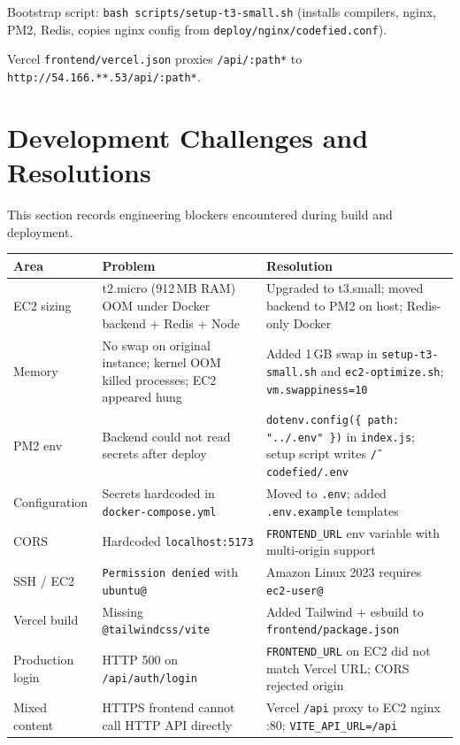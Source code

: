 \documentclass[11pt,a4paper]{article}
\newcommand{\maskedecip}{\texttt{54.166.**.53}}
\begin{document}
Bootstrap script: \texttt{bash scripts/setup-t3-small.sh} (installs compilers, nginx, PM2, Redis, copies nginx config from \texttt{deploy/nginx/codefied.conf}).

Vercel \texttt{frontend/vercel.json} proxies \texttt{/api/:path*} to \texttt{http://\maskedecip/api/:path*}.

\section{Development Challenges and Resolutions}

This section records engineering blockers encountered during build and deployment.

\begin{longtable}{@{}p{3.3cm}p{4cm}p{6.3cm}@{}}
\toprule
\textbf{Area} & \textbf{Problem} & \textbf{Resolution} \\
\midrule
\endhead
EC2 sizing &
t2.micro (912\,MB RAM) OOM under Docker backend + Redis + Node &
Upgraded to t3.small; moved backend to PM2 on host; Redis-only Docker \\
\addlinespace
Memory &
No swap on original instance; kernel OOM killed processes; EC2 appeared hung &
Added 1\,GB swap in \texttt{setup-t3-small.sh} and \texttt{ec2-optimize.sh}; \texttt{vm.swappiness=10} \\
\addlinespace
PM2 env &
Backend could not read secrets after deploy &
\texttt{dotenv.config(\{ path: "../.env" \})} in \texttt{index.js}; setup script writes \texttt{\~/codefied/.env} \\
\addlinespace
Configuration &
Secrets hardcoded in \texttt{docker-compose.yml} &
Moved to \texttt{.env}; added \texttt{.env.example} templates \\
\addlinespace
CORS &
Hardcoded \texttt{localhost:5173} &
\texttt{FRONTEND\_URL} env variable with multi-origin support \\
\addlinespace
SSH / EC2 &
\texttt{Permission denied} with \texttt{ubuntu@} &
Amazon Linux 2023 requires \texttt{ec2-user@} \\
\addlinespace
Vercel build &
Missing \texttt{@tailwindcss/vite} &
Added Tailwind + esbuild to \texttt{frontend/package.json} \\
\addlinespace
Production login &
HTTP 500 on \texttt{/api/auth/login} &
\texttt{FRONTEND\_URL} on EC2 did not match Vercel URL; CORS rejected origin \\
\addlinespace
Mixed content &
HTTPS frontend cannot call HTTP API directly &
Vercel \texttt{/api} proxy to EC2 nginx :80; \texttt{VITE\_API\_URL=/api} \\

\end{longtable}
\end{document}
